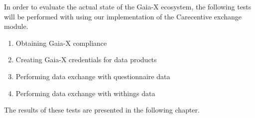 In order to evaluate the actual state of the Gaia-X ecosystem, the following tests will be performed with using our implementation of the Carecentive exchange module.

\begin{enumerate}
    \item Obtaining Gaia-X compliance
    \item Creating Gaia-X credentials for data products
    \item Performing data exchange with questionnaire data
    \item Performing data exchange with withings data
\end{enumerate}

The results of these tests are presented in the following chapter.
